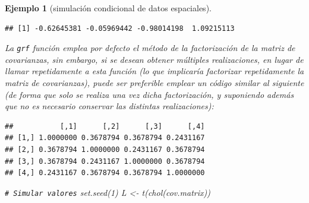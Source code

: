 \documentclass[
]{book}
\newenvironment{Shaded}{\begin{snugshade}}{\end{snugshade}}
\newcommand{\AttributeTok}[1]{\textcolor[rgb]{0.77,0.63,0.00}{#1}}
\newcommand{\CommentTok}[1]{\textcolor[rgb]{0.56,0.35,0.01}{\textit{#1}}}
\newcommand{\DecValTok}[1]{\textcolor[rgb]{0.00,0.00,0.81}{#1}}
\newcommand{\FunctionTok}[1]{\textcolor[rgb]{0.00,0.00,0.00}{#1}}
\newcommand{\NormalTok}[1]{#1}
\newcommand{\OtherTok}[1]{\textcolor[rgb]{0.56,0.35,0.01}{#1}}
\newcommand{\SpecialCharTok}[1]{\textcolor[rgb]{0.00,0.00,0.00}{#1}}
\theoremstyle{break}
\newtheorem{example}{Ejemplo}[chapter]
\theoremstyle{nonumberplain}
\renewcommand{\CommentTok}[1]{\textcolor[rgb]{0.41,0.41,0.41}{\texttt{#1}}}
\begin{document}
\begin{example}[simulación condicional de datos espaciales]
\begin{verbatim}
## [1] -0.62645381 -0.05969442 -0.98014198  1.09215113
\end{verbatim}

La \texttt{grf} función emplea por defecto el método de la factorización de la matriz de covarianzas,
sin embargo, si se desean obtener múltiples realizaciones, en lugar de llamar repetidamente a esta función (lo que implicaría factorizar repetidamente la matriz de covarianzas),
puede ser preferible emplear un código similar al siguiente (de forma que solo se realiza una vez dicha factorización, y suponiendo además que no es necesario conservar las distintas realizaciones):

\begin{Shaded}
\end{Shaded}

\begin{verbatim}
##           [,1]      [,2]      [,3]      [,4]
## [1,] 1.0000000 0.3678794 0.3678794 0.2431167
## [2,] 0.3678794 1.0000000 0.2431167 0.3678794
## [3,] 0.3678794 0.2431167 1.0000000 0.3678794
## [4,] 0.2431167 0.3678794 0.3678794 1.0000000
\end{verbatim}

\begin{Shaded}
\begin{Highlighting}[]
\CommentTok{\# Simular valores}
\FunctionTok{set.seed}\NormalTok{(}\DecValTok{1}\NormalTok{)}
\NormalTok{L }\OtherTok{\textless{}{-}} \FunctionTok{t}\NormalTok{(}\FunctionTok{chol}\NormalTok{(cov.matrix))}


\end{Highlighting}
\end{Shaded}
\end{example}
\end{document}
